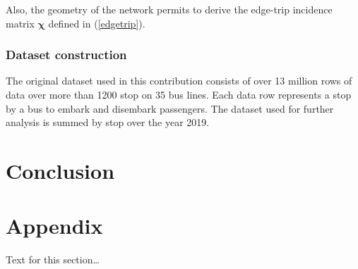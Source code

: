 \documentclass{bmcart}
\begin{document}
Also, the geometry of the network permits to derive the edge-trip incidence matrix $\bm{\chi}$ defined in (\ref{edgetrip}). 

\subsubsection{Dataset construction}
The original dataset used in this contribution consists of over 13 million rows of data over more than 1200 stop on 35 bus lines. Each data row represents a stop by a bus to embark and disembark passengers. The dataset used for further analysis is summed by stop over the year 2019.


\section{Conclusion}

  
\newpage


\section*{Appendix}
Text for this section\ldots

\end{document}
